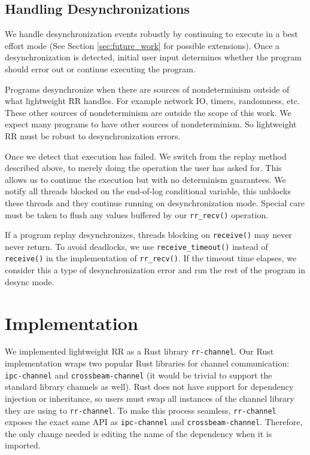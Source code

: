 \documentclass{article}
\begin{document}
\subsection{Handling Desynchronizations}
\label{sec:handle_desync}
We handle desynchronization events robustly by continuing to execute in
a best effort mode (See Section \ref{sec:future_work} for possible extensions).
Once a desynchronization is detected, initial user input determines whether the
program should error out or continue executing the program.

Programs desynchronize when there are sources of nondeterminism outside of what lightweight
RR handles. For example network IO, timers, randomness, etc. These
other sources of nondeterminism are outside the scope of this work. We expect many
programs to have other sources of nondeterminism. So lightweight RR must be robust to
desynchronization errors.

Once we detect that execution has failed. We switch from the replay method described
above, to merely doing the operation the user has asked for. This allows us to
continue the execution but with no determinism guarantees. We notify all threads
blocked on the end-of-log conditional variable, this unblocks these threads and
they continue running on desynchronization mode. Special care must be taken to
flush any values buffered by our \texttt{rr\_recv()} operation.

If a program replay desynchronizes, threads blocking on \texttt{receive()} may never never
return. To avoid deadlocks, we use \texttt{receive\_timeout()} instead of \texttt{receive()}
in the implementation of \texttt{rr\_recv()}. If the timeout time elapses, we consider this
a type of desynchronization error and run the rest of the program in desync mode.

\section{Implementation}
We implemented lightweight RR as a Rust library \texttt{rr-channel}. Our Rust implementation
wraps two popular Rust libraries
for channel communication: \texttt{ipc-channel} and \texttt{crossbeam-channel} (it would be
trivial to support the standard library channels as well). Rust does not have
support for dependency injection or inheritance, so users must swap all instances of the
channel library they are using to \texttt{rr-channel}. To make this process seamless,
\texttt{rr-channel} exposes the exact same API as \texttt{ipc-channel} and
\texttt{crossbeam-channel}. Therefore, the only change needed is editing the name of the
dependency when it is imported.
\end{document}
